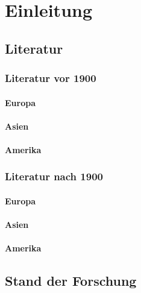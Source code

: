 \chapter{Einleitung}

\section{Literatur}
\subsection{Literatur vor 1900}


\subsubsection{Europa}

\blindtext 

\blindtext

\blindtext

\subsubsection{Asien}

\blindtext 

\blindtext

\blindtext

\subsubsection{Amerika}

\blindtext 

\blindtext

\blindtext

\subsection{Literatur nach 1900}

\subsubsection{Europa}

\blindtext 

\blindtext

\blindtext

\subsubsection{Asien}

\blindtext 

\blindtext

\blindtext

\subsubsection{Amerika}

\blindtext 

\blindtext

\blindtext


\section{Stand der Forschung}

\blindtext 

\blindtext

\blindtext